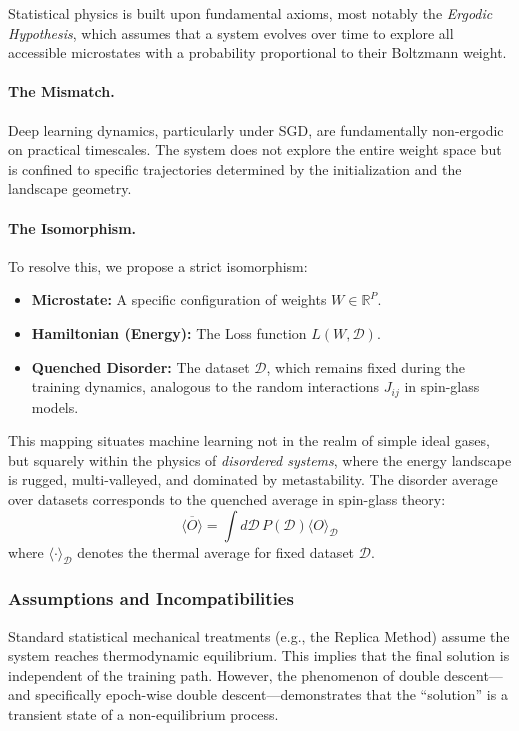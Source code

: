 Statistical physics is built upon fundamental axioms, most notably the \textit{Ergodic Hypothesis}, which assumes that a system evolves over time to explore all accessible microstates with a probability proportional to their Boltzmann weight.

\paragraph{The Mismatch.} Deep learning dynamics, particularly under SGD, are fundamentally non-ergodic on practical timescales. The system does not explore the entire weight space but is confined to specific trajectories determined by the initialization and the landscape geometry.

\paragraph{The Isomorphism.} To resolve this, we propose a strict isomorphism:
\begin{itemize}[topsep=1pt,itemsep=1pt]
    \item \textbf{Microstate:} A specific configuration of weights $W \in \mathbb{R}^P$.
    \item \textbf{Hamiltonian (Energy):} The Loss function $L(W, \mathcal{D})$.
    \item \textbf{Quenched Disorder:} The dataset $\mathcal{D}$, which remains fixed during the training dynamics, analogous to the random interactions $J_{ij}$ in spin-glass models.
\end{itemize}

This mapping situates machine learning not in the realm of simple ideal gases, but squarely within the physics of \textit{disordered systems}, where the energy landscape is rugged, multi-valleyed, and dominated by metastability. The disorder average over datasets corresponds to the quenched average in spin-glass theory:
\begin{equation}
    \overline{\langle O \rangle} = \int d\mathcal{D} \, P(\mathcal{D}) \langle O \rangle_{\mathcal{D}}
\end{equation}
where $\langle \cdot \rangle_{\mathcal{D}}$ denotes the thermal average for fixed dataset $\mathcal{D}$.

\subsubsection{Assumptions and Incompatibilities}

Standard statistical mechanical treatments (e.g., the Replica Method) assume the system reaches thermodynamic equilibrium. This implies that the final solution is independent of the training path. However, the phenomenon of double descent---and specifically epoch-wise double descent---demonstrates that the ``solution'' is a transient state of a non-equilibrium process. 

